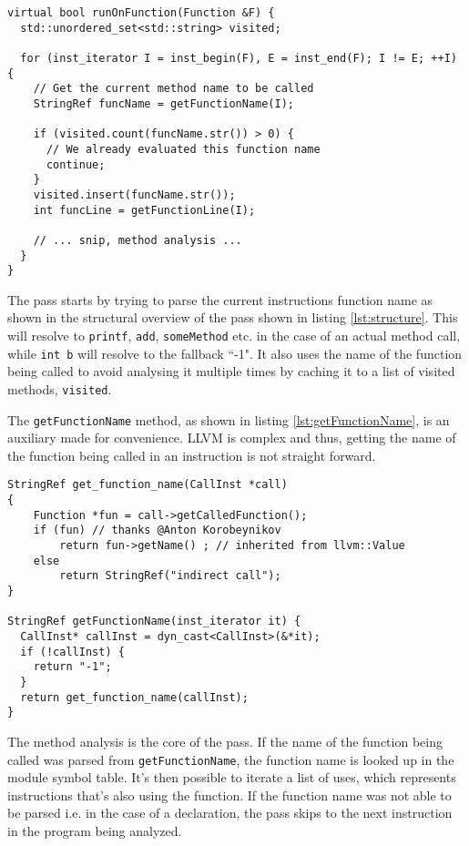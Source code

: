 \documentclass[a4paper,11pt]{article}
\theoremstyle{mytheor}
\begin{document}
\begin{lstlisting}[caption={FunctionPass structural overview},label={lst:structure}]
virtual bool runOnFunction(Function &F) {
  std::unordered_set<std::string> visited;

  for (inst_iterator I = inst_begin(F), E = inst_end(F); I != E; ++I) {
    // Get the current method name to be called
    StringRef funcName = getFunctionName(I);

    if (visited.count(funcName.str()) > 0) {
      // We already evaluated this function name
      continue;
    }
    visited.insert(funcName.str());
    int funcLine = getFunctionLine(I);

    // ... snip, method analysis ...
  }
}
\end{lstlisting}
The pass starts by trying to parse the current instructions function name as shown in the structural overview of the pass shown in listing \ref{lst:structure}.
This will resolve to \verb!printf!, \verb!add!, \verb!someMethod! etc. in the case of an actual method call,
while \verb!int b! will resolve to the fallback ``-1".
It also uses the name of the function being called to avoid analysing it multiple times by caching it to a list of visited methods, \verb!visited!.

The \verb!getFunctionName! method, as shown in listing \ref{lst:getFunctionName}, is an auxiliary made for convenience.
LLVM is complex and thus, getting the name of the function being called in an instruction is not straight forward.

\begin{lstlisting}[caption={getFunctionName auxiliary method},label={lst:getFunctionName}]
StringRef get_function_name(CallInst *call)
{
    Function *fun = call->getCalledFunction();
    if (fun) // thanks @Anton Korobeynikov
        return fun->getName() ; // inherited from llvm::Value
    else
        return StringRef("indirect call");
}

StringRef getFunctionName(inst_iterator it) {
  CallInst* callInst = dyn_cast<CallInst>(&*it);
  if (!callInst) {
    return "-1";
  }
  return get_function_name(callInst);
}
\end{lstlisting}
The method analysis is the core of the pass.
If the name of the function being called was parsed from \verb!getFunctionName!,
the function name is looked up in the module symbol table.
It's then possible to iterate a list of uses, which represents instructions that's also using the function.
If the function name was not able to be parsed i.e. in the case of a declaration, the pass skips to the next instruction in the program being analyzed.
\end{document}
